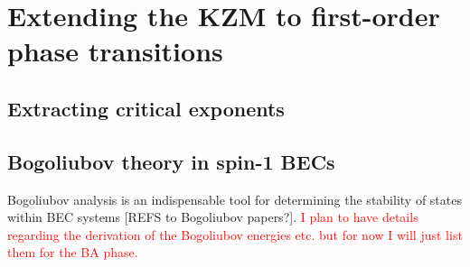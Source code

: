 \section{Extending the KZM to first-order phase transitions}

\subsection{Extracting critical exponents}

\subsection{Bogoliubov theory in spin-1 BECs}
Bogoliubov analysis is an indispensable tool for determining the stability of
states within BEC systems [REFS to Bogoliubov papers?].
\textcolor{red}{I plan to have details regarding the derivation of the
Bogoliubov energies etc. but for now I will just list them for the BA phase.}

